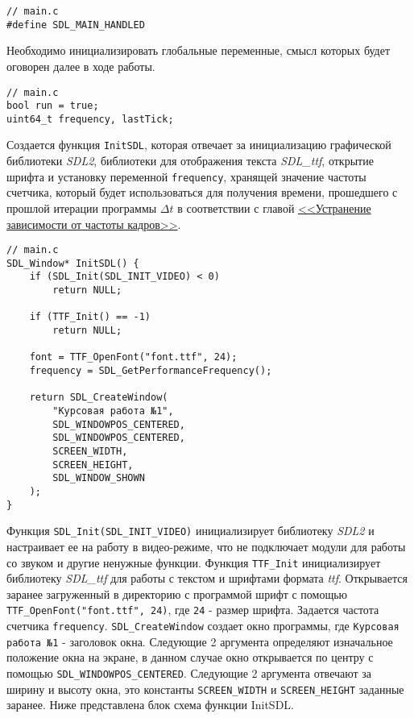 \documentclass[14pt]{extarticle}
\begin{document}
{\begin{spacing}{1.5}
    \end{spacing}
    \begin{lstlisting}
// main.c
#define SDL_MAIN_HANDLED\end{lstlisting}
    \par
    \begin{spacing}{1.5}
        Необходимо инициализировать глобальные переменные, смысл которых будет оговорен далее в ходе работы.
    \end{spacing}
    \par
    \begin{lstlisting}
// main.c
bool run = true;
uint64_t frequency, lastTick;\end{lstlisting}
    \par
    \begin{spacing}{1.5}
        Создается функция \verb|InitSDL|, которая отвечает за инициализацию графической библиотеки \textit{SDL2}, библиотеки для отображения текста \textit{SDL\_ttf}, открытие шрифта и установку переменной \verb|frequency|, хранящей значение частоты счетчика, который будет использоваться для получения времени, прошедшего с прошлой итерации программы $\Delta{t}$ в соответствии с главой \hyperref[sec:fps]{<<Устранение зависимости от частоты кадров>>}.
    \end{spacing}
    \begin{lstlisting}
// main.c
SDL_Window* InitSDL() {
	if (SDL_Init(SDL_INIT_VIDEO) < 0)
		return NULL;

	if (TTF_Init() == -1)
		return NULL;

	font = TTF_OpenFont("font.ttf", 24);
	frequency = SDL_GetPerformanceFrequency();

    return SDL_CreateWindow(
    	"Курсовая работа №1",
    	SDL_WINDOWPOS_CENTERED,
    	SDL_WINDOWPOS_CENTERED,
    	SCREEN_WIDTH,
    	SCREEN_HEIGHT,
    	SDL_WINDOW_SHOWN
    );
}\end{lstlisting}
    \par

    \begin{spacing}{1.5}
        Функция \verb|SDL_Init(SDL_INIT_VIDEO)| инициализирует библиотеку \textit{SDL2} и настраивает ее на работу в видео-режиме, что не подключает модули для работы со звуком и другие ненужные функции. Функция \verb|TTF_Init| инициализирует библиотеку \textit{SDL\_ttf} для работы с текстом и шрифтами формата \textit{ttf}. Открывается заранее загруженный в директорию с программой шрифт с помощью \verb|TTF_OpenFont("font.ttf", 24)|, где \verb|24| - размер шрифта.
        Задается частота счетчика \verb|frequency|. \verb|SDL_CreateWindow| создает окно программы, где \verb|Курсовая работа №1| - заголовок окна. Следующие 2 аргумента определяют изначальное положение окна на экране, в данном случае окно открывается по центру с помощью \verb|SDL_WINDOWPOS_CENTERED|. Следующие 2 аргумента отвечают за ширину и высоту окна, это константы \verb|SCREEN_WIDTH| и \verb|SCREEN_HEIGHT| заданные заранее.
        Ниже представлена блок схема функции InitSDL.
        \par


\end{spacing}}
\end{document}
